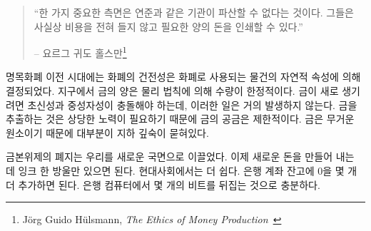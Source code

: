 \begin{samepage}\begin{quotation}
		\begin{comment}	
			\enquote{One important aspect of this new reality is that institutions like
				the Fed cannot go bankrupt. They can print any amount of money that
				they might need for themselves at virtually zero cost.}
		\end{comment}
		\enquote{한 가지 중요한 측면은 연준과 같은 기관이 파산할 수 없다는 것이다. 그들은 사실상 비용을
			전혀 들지 않고 필요한 양의 돈을 인쇄할 수 있다.}
		\begin{flushright} -- 요르그 귀도 홀스만\footnote{Jörg Guido Hülsmann, \textit{The
					Ethics of Money Production}~\cite{hulsmann2008ethics}}
\end{flushright}\end{quotation}\end{samepage}

\begin{comment}	
	Before we had fiat currencies, the soundness of money was determined by
	the natural properties of the stuff which we used as money. The amount
	of gold on earth is limited by the laws of physics. Gold is rare because
	supernovae and neutron star collisions are rare. The \enquote{flow} of gold is
	limited because extracting it is quite an effort. Being a heavy element
	it is mostly buried deep underground.
\end{comment}
명목화폐 이전 시대에는 화폐의 건전성은 화폐로 사용되는 물건의 자연적 속성에 의해 결정되었다.
지구에서 금의 양은 물리 법칙에 의해 수량이 한정적이다.
금이 새로 생기려면 초신성과 중성자성이 충돌해야 하는데, 이러한 일은 거의 발생하지 않는다.
금을 추출하는 것은 상당한 노력이 필요하기 때문에 금의 공금은 제한적이다.
금은 무거운 원소이기 때문에 대부분이 지하 깊숙이 묻혀있다.

\begin{comment}	
	The abolishment of the gold standard gave way to a new reality: adding new money
	requires just a drop of ink. In our modern world adding a couple of zeros to the
	balance of a bank account requires even less effort: flipping a few bits in a
	bank computer is enough.
\end{comment}
금본위제의 폐지는 우리를 새로운 국면으로 이끌었다.
이제 새로운 돈을 만들어 내는 데 잉크 한 방울만 있으면 된다.
현대사회에서는 더 쉽다.
은행 계좌 잔고에 0을 몇 개 더 추가하면 된다.
은행 컴퓨터에서 몇 개의 비트를 뒤집는 것으로 충분하다.

